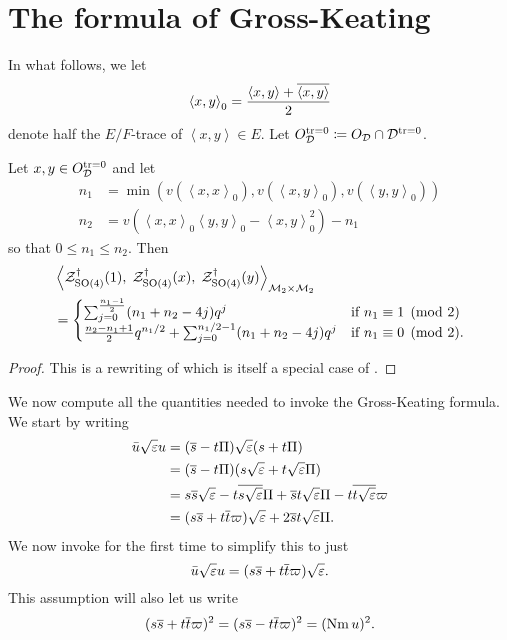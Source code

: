 \section{The formula of Gross-Keating}
\label{sec:GK}
In what follows, we let
\[ \left\langle x, y \right\rangle _0
  = \frac{\left\langle x,y \right\rangle + \overline{\left\langle x,y \right\rangle}}{2} \]
denote half the $E/F$-trace of $\left\langle x,y \right\rangle \in E$.
Let $O_\mathcal D^{\operatorname{tr} = 0} \coloneqq O_\mathcal D \cap \mathcal D^{\operatorname{tr} = 0}$.

\begin{proposition}
  \label{prop:GK}
  Let $x,y \in O_\mathcal D^{\operatorname{tr} = 0}$ and let
  \begin{align*}
    n_1 &= \min\left( v(\left\langle x,x \right\rangle _0), v(\left\langle x,y \right\rangle _0), v(\left\langle y,y \right\rangle _0) \right) \\
    n_2 &= v\left( \left\langle x,x \right\rangle _0 \left\langle y,y \right\rangle _0 - \left\langle x,y \right\rangle^2_0 \right) - n_1
  \end{align*}
  so that $0 \le n_1 \le n_2$.
  Then
  \begin{align*}
    &\left< \mathcal Z^{\dagger}_{\operatorname{SO}(4)}(1), \; \mathcal Z^{\dagger}_{\operatorname{SO}(4)}(x), \; \mathcal Z^{\dagger}_{\operatorname{SO}(4)}(y) \right>_{\mathcal M_2 \times \mathcal M_2} \\
    &=
    \begin{cases}
      \sum_{j=0}^{\frac{n_1-1}{2}} (n_1+n_2-4j) q^j & \text{if } n_1 \equiv 1 \pmod 2 \\
      \frac{n_2-n_1+1}{2} q^{n_1/2} + \sum_{j=0}^{n_1/2-1} (n_1+n_2-4j) q^j & \text{if } n_1 \equiv 0 \pmod 2.
    \end{cases}
  \end{align*}
\end{proposition}
\begin{proof}
  This is a rewriting of \cite[Proposition 14.6]{ref:Kudla1997}
  which is itself a special case of \cite[Proposition 5.4]{ref:GK}.
\end{proof}

We now compute all the quantities needed to invoke the Gross-Keating formula.
We start by writing
\begin{align*}
  \bar u \sqrt{\varepsilon} u
  &= (\overline s - t \Pi) \sqrt{\varepsilon} (s + t \Pi) \\
  &= (\overline s - t \Pi) (s \sqrt{\varepsilon} + t \sqrt{\varepsilon} \Pi) \\
  &= s \overline s \sqrt{\varepsilon} - t \overline{s\sqrt{\varepsilon}} \Pi + \overline s t \sqrt{\varepsilon} \Pi - t \overline{t \sqrt{\varepsilon}} \varpi \\
  &= (s \overline s + t \overline t \varpi) \sqrt{\varepsilon} + 2 \overline s t \sqrt{\varepsilon} \Pi.
\end{align*}
We now invoke  for the first time to simplify this to just
\[ \bar u \sqrt{\varepsilon} u = (s \overline s + t \overline t \varpi) \sqrt{\varepsilon}. \]
This assumption will also let us write
\[ (s \overline s + t \overline t \varpi)^2 = (s \overline s - t \overline t \varpi)^2 = (\operatorname{Nm} u)^2. \]


